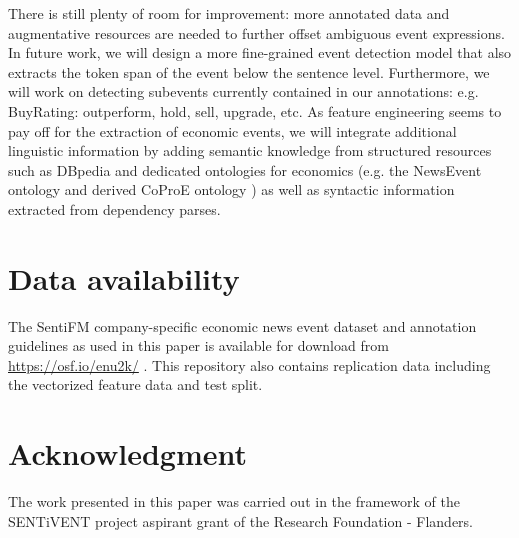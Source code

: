 \documentclass[11pt,a4paper]{article}
\begin{document}
There is still plenty of room for improvement: more annotated data and augmentative resources are needed to further offset ambiguous event expressions.
In future work, we will design a more fine-grained event detection model that also extracts the token span of the event below the sentence level.
Furthermore, we will work on detecting subevents currently contained in our annotations: e.g. BuyRating: outperform, hold, sell, upgrade, etc.
As feature engineering seems to pay off for the extraction of economic events, we will integrate additional linguistic information by adding semantic knowledge from structured resources such as DBpedia and dedicated ontologies for economics (e.g. the NewsEvent ontology \cite{losch2009newsevents} and derived CoProE ontology \cite{kakkonen2011developing}) as well as syntactic information extracted from dependency parses.

\section{Data availability} \label{sec:dataavailability}
The SentiFM company-specific economic news event dataset and annotation guidelines as used in this paper is available for download from \url{https://osf.io/enu2k/} \cite{sentifmendata2018}. This repository also contains replication data including the vectorized feature data and test split.

\section{Acknowledgment}
The work presented in this paper was carried out in the framework of the SENTiVENT project aspirant grant of the Research Foundation - Flanders.



\end{document}
